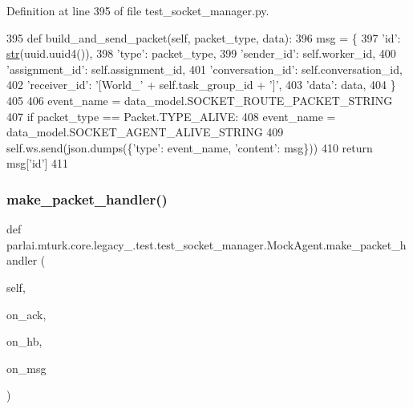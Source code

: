 Definition at line 395 of file test\+\_\+socket\+\_\+manager.\+py.


\begin{DoxyCode}
395     \textcolor{keyword}{def }build\_and\_send\_packet(self, packet\_type, data):
396         msg = \{
397             \textcolor{stringliteral}{'id'}: \hyperlink{namespacegenerate__task__READMEs_a5b88452ffb87b78c8c85ececebafc09f}{str}(uuid.uuid4()),
398             \textcolor{stringliteral}{'type'}: packet\_type,
399             \textcolor{stringliteral}{'sender\_id'}: self.worker\_id,
400             \textcolor{stringliteral}{'assignment\_id'}: self.assignment\_id,
401             \textcolor{stringliteral}{'conversation\_id'}: self.conversation\_id,
402             \textcolor{stringliteral}{'receiver\_id'}: \textcolor{stringliteral}{'[World\_'} + self.task\_group\_id + \textcolor{stringliteral}{']'},
403             \textcolor{stringliteral}{'data'}: data,
404         \}
405 
406         event\_name = data\_model.SOCKET\_ROUTE\_PACKET\_STRING
407         \textcolor{keywordflow}{if} packet\_type == Packet.TYPE\_ALIVE:
408             event\_name = data\_model.SOCKET\_AGENT\_ALIVE\_STRING
409         self.ws.send(json.dumps(\{\textcolor{stringliteral}{'type'}: event\_name, \textcolor{stringliteral}{'content'}: msg\}))
410         \textcolor{keywordflow}{return} msg[\textcolor{stringliteral}{'id'}]
411 
\end{DoxyCode}
\mbox{\label{classparlai_1_1mturk_1_1core_1_1legacy__2018_1_1test_1_1test__socket__manager_1_1MockAgent_af0f9ec941e61587e1f4145c354031d7a}} 
\subsubsection{\texorpdfstring{make\+\_\+packet\+\_\+handler()}{make\_packet\_handler()}}
{\footnotesize\ttfamily def parlai.\+mturk.\+core.\+legacy\+\_.\+test.\+test\+\_\+socket\+\_\+manager.\+Mock\+Agent.\+make\+\_\+packet\+\_\+handler (\begin{DoxyParamCaption}\item[{}]{self,  }\item[{}]{on\+\_\+ack,  }\item[{}]{on\+\_\+hb,  }\item[{}]{on\+\_\+msg }\end{DoxyParamCaption})}

